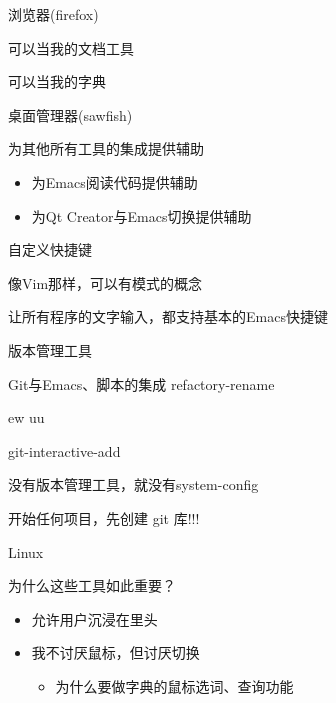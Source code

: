 \documentclass[presentation,dvipdfmx,CJKbookmarks]{beamer}
\begin{document}
\begin{CJK*}{UTF8}{simsun}
\begin{frame}[label={sec:orgaebad94}]{浏览器(firefox)}
\begin{block}{可以当我的文档工具}
\end{block}
\begin{block}{可以当我的字典}
\end{block}
\end{frame}
\begin{frame}[label={sec:org38b65d9}]{桌面管理器(sawfish)}
\begin{block}{为其他所有工具的集成提供辅助}
\begin{itemize}
\item 为Emacs阅读代码提供辅助
\item 为Qt Creator与Emacs切换提供辅助
\end{itemize}
\end{block}
\begin{block}{自定义快捷键}
\end{block}
\begin{block}{像Vim那样，可以有模式的概念}
\end{block}
\begin{block}{让所有程序的文字输入，都支持基本的Emacs快捷键}
\end{block}
\end{frame}

\begin{frame}[label={sec:orge17fc2d}]{版本管理工具}
\begin{block}{Git与Emacs、脚本的集成 refactory-rename}
\end{block}
\begin{block}{ew uu}
\end{block}
\begin{block}{git-interactive-add}
\end{block}
\begin{block}{没有版本管理工具，就没有system-config}
\end{block}
\begin{block}{开始任何项目，先创建 git 库!!!}
\end{block}
\end{frame}

\begin{frame}[label={sec:orge7d8d63}]{Linux}
\begin{block}{为什么这些工具如此重要？}
\begin{itemize}
\item 允许用户沉浸在里头
\item 我不讨厌鼠标，但讨厌切换
\begin{itemize}
\item 为什么要做字典的鼠标选词、查询功能
\end{itemize}
\end{itemize}
\end{block}
\end{frame}


\end{CJK*}
\end{document}
